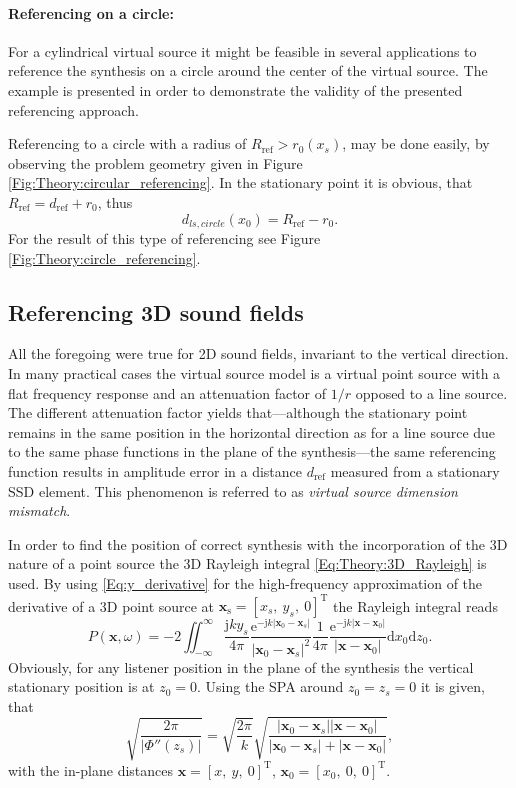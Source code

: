 \documentclass[12pt,a4paper]{article}
\newcommand{\td}{\mathrm{d}}
\newcommand{\te}{\mathrm{e}}
\newcommand{\ti}{\mathrm{j}}
\newcommand{\dref}{d_{\mathrm{ref}}}
\newcommand{\vx}{\mathbf{x}}
\newcommand{\vxo}{\mathbf{x}_0}
\newcommand{\vxs}{\mathbf{x}_{\mathrm{s}}}
\begin{document}
\paragraph{Referencing on a circle:\\}
For a cylindrical virtual source it might be feasible in several applications to reference the synthesis on a circle around the center of the virtual source. The example is presented in order to demonstrate the validity of the presented referencing approach.

Referencing to a circle with a radius of $R_{\mathrm{ref}} > r_0(x_s)$, may be done easily, by observing the problem geometry given in Figure \ref{Fig:Theory:circular_referencing}. 
In the stationary point it is obvious, that $R_{\mathrm{ref}} = \dref + r_0$, thus
\begin{equation}
d_{ls,circle}(x_0) = R_{\mathrm{ref}} - r_0.
\end{equation}
For the result of this type of referencing see Figure \ref{Fig:Theory:circle_referencing}.


\subsection{Referencing 3D sound fields}

All the foregoing were true for 2D sound fields, invariant to the vertical direction. In many practical cases the virtual source model is a virtual point source with a flat frequency response and an attenuation factor of $1/r$ opposed to a line source. The different attenuation factor yields that---although the stationary point remains in the same position in the horizontal direction as for a line source due to the same phase functions in the plane of the synthesis---the same referencing function results in amplitude error in a  distance $\dref$ measured from a stationary SSD element. This phenomenon is referred to as \emph{virtual source dimension mismatch}.

In order to find the position of correct synthesis with the incorporation of the 3D nature of a point source the 3D Rayleigh integral \eqref{Eq:Theory:3D_Rayleigh} is used. By using \eqref{Eq:y_derivative} for the high-frequency approximation of the derivative of a 3D point source at $\vxs = [x_s,\ y_s,\ 0]^{\mathrm{T}}$  the Rayleigh integral reads
\begin{equation}
P(\vx,\omega) = -2 \iint_{-\infty}^{\infty} \frac{\ti k y_s}{4\pi} \frac{\te^{-\ti k | \vxo - \mathbf{x}_s | }}{|\vxo - \mathbf{x}_s|^2	} \frac{1}{4\pi} \frac{\te^{-\ti k | \vx - \vxo| }}{ | \vx - \vxo| } \td x_0 \td z_0.
\end{equation}
Obviously, for any listener position in the plane of the synthesis the vertical stationary position is at $z_0=0$. Using the SPA around $z_0 = z_s = 0$ it is given, that
\begin{equation}
\sqrt{\frac{2\pi}{|\Phi''(z_s)|}} = \sqrt{\frac{2\pi}{ k }}\sqrt{\frac{| \vxo - \mathbf{x}_s | | \vx - \vxo|  }{| \vxo - \mathbf{x}_s | + | \vx - \vxo| }},
\end{equation}
with the in-plane distances $\vx = [x,\ y,\ 0]^{\mathrm{T}}$, $\vxo = [x_0,\ 0,\ 0]^{\mathrm{T}}$.
\end{document}
